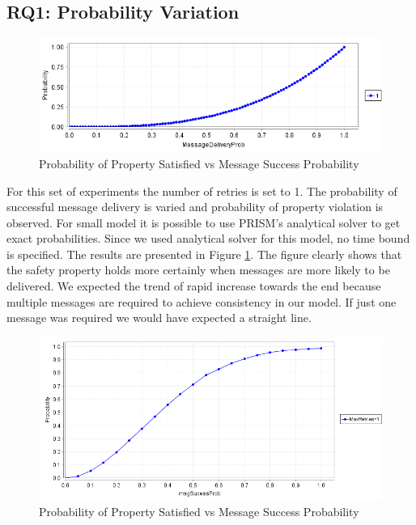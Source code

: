 \subsection{RQ1: Probability Variation}

\begin{figure} 
  \includegraphics[width=\textwidth]{RQ1-small.png}
  \caption{Probability of Property Satisfied vs Message Success Probability}
  \label{RQ1-small}
\end{figure}

For this set of experiments the number of retries is set to 1. The probability of successful message delivery is varied and probability of property violation is observed. For small model it is possible to use PRISM's analytical solver to get exact probabilities. Since we used analytical solver for this model, no time bound is specified. The results are presented in Figure \ref{RQ1-small}. The figure clearly shows that the safety property holds more certainly when messages are more likely to be delivered. We expected the trend of rapid increase towards the end because multiple messages are required to achieve consistency in our model. If just one message was required we would have expected a straight line.

\begin{figure} 
  \includegraphics[width=\textwidth]{RQ1-large.png}
  \caption{Probability of Property Satisfied vs Message Success Probability}
  \label{RQ1-large}
\end{figure}

